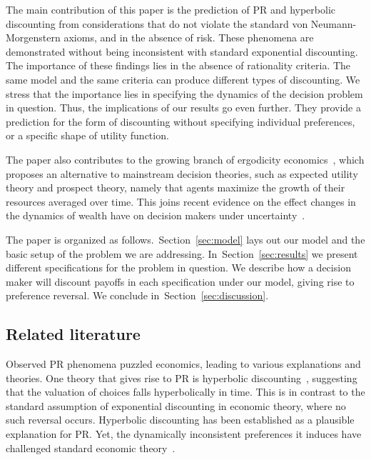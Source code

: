 \documentclass[11pt]{article}
\newcommand{\Sref}[1]{Section~\ref{sec:#1}}
\newcommand{\ie}{{\it i.e.}\ }
\numberwithin{equation}{section}
\begin{document}
The main contribution of this paper is the prediction of PR and hyperbolic discounting from considerations that do not violate the standard von Neumann-Morgenstern axioms, and in the absence of risk. These phenomena are demonstrated without being inconsistent with standard exponential discounting. The importance of these findings lies in the absence of rationality criteria. The same model and the same criteria can produce different types of discounting. We stress that the importance lies in specifying the dynamics of the decision problem in question. Thus, the implications of our results go even further. They provide a prediction for the form of discounting without specifying individual preferences, or a specific shape of utility function. 

The paper also contributes to the growing branch of ergodicity economics~\citep{peters2016evaluating,berman2016far,peters2018time}, which proposes an alternative to mainstream decision theories, such as expected utility theory and prospect theory, namely that agents maximize the growth of their resources averaged over time. This joins recent evidence on the effect changes in the dynamics of wealth have on decision makers under uncertainty~\citep{hulme2019unpublished}.

The paper is organized as follows.~\Sref{model} lays out our model and the basic setup of the problem we are addressing. In~\Sref{results} we present different specifications for the problem in question. We describe how a decision maker will discount payoffs in each specification under our model, giving rise to preference reversal. We conclude in~\Sref{discussion}.

\subsection{Related literature}

Observed PR phenomena puzzled economics, leading to various explanations and theories. One theory that gives rise to PR is hyperbolic discounting~\citep{ainslie1992picoeconomics,sozou1998hyperbolic,laibson1997golden}, suggesting that the valuation of choices falls hyperbolically in time. 
This is in contrast to the standard assumption of exponential discounting in economic theory, where no such reversal occurs.
Hyperbolic discounting has been established as a plausible explanation for PR. 
Yet, the dynamically inconsistent preferences it induces have challenged standard economic theory~\citep{laibson1997golden,starmer2000developments,thaler2016behavioral}. 
\end{document}
